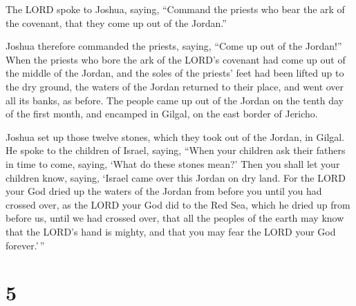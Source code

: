  The LORD spoke to Joshua, saying,  ``Command
the priests who bear the ark of the covenant, that they come up out of
the Jordan.''

 Joshua therefore commanded the priests, saying, ``Come up
out of the Jordan!''  When the priests who bore the ark of
the LORD's covenant had come up out of the middle of the Jordan, and the
soles of the priests' feet had been lifted up to the dry ground, the
waters of the Jordan returned to their place, and went over all its
banks, as before.  The people came up out of the Jordan on
the tenth day of the first month, and encamped in Gilgal, on the east
border of Jericho.

 Joshua set up those twelve stones, which they took out of
the Jordan, in Gilgal.  He spoke to the children of Israel,
saying, ``When your children ask their fathers in time to come, saying,
`What do these stones mean?'  Then you shall let your
children know, saying, `Israel came over this Jordan on dry land.
 For the LORD your God dried up the waters of the Jordan
from before you until you had crossed over, as the LORD your God did to
the Red Sea, which he dried up from before us, until we had crossed
over,  that all the peoples of the earth may know that the
LORD's hand is mighty, and that you may fear the LORD your God
forever.'\,''

\hypertarget{section-4}{%
\section{5}\label{section-4}}

